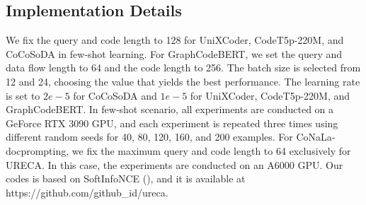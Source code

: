 \subsection{Implementation Details}
We fix the query and code length to 128 for UniXCoder, CodeT5p-220M, and CoCoSoDA in few-shot learning. 
For GraphCodeBERT, we set the query and data flow length to 64 and the code length to 256.
The batch size is selected from 12 and 24, choosing the value that yields the best performance. 
The learning rate is set to $2e-5$ for CoCoSoDA and $1e-5$ for UniXCoder, CodeT5p-220M, and GraphCodeBERT.
In few-shot scenario, all experiments are conducted on a GeForce RTX 3090 GPU, 
and each experiment is repeated three times using different random seeds for 40, 80, 120, 160, and 200 examples.
For CoNaLa-docprompting, we fix the maximum query and code length to 64 exclusively for URECA. 
In this case, the experiments are conducted on an A6000 GPU.
Our codes is based on SoftInfoNCE (\cite{HaochenXAC23}), and it is available at https://github.com/github\_id/ureca.